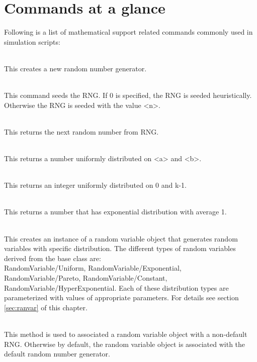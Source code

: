 \section{Commands at a glance}
\label{sec:mathcommand}

Following is a list of mathematical support related commands commonly used
in simulation scripts:
\begin{flushleft}
\\
This creates a new random number generator.


\\
This command seeds the RNG. If 0 is specified, the RNG is seeded
heuristically. Otherwise the RNG is seeded with the value <n>.


\\
This returns the next random number from RNG.


\\
This returns a number uniformly distributed on <a> and <b>.


\\
This returns an integer uniformly distributed on 0 and k-1.


\\
This returns a number that has exponential distribution with average 1.


\\
This creates an instance of a random variable object that generates random 
variables with specific distribution. The different types of random 
variables derived from the base class are:\\
RandomVariable/Uniform, RandomVariable/Exponential, RandomVariable/Pareto,
RandomVariable/Constant, RandomVariable/HyperExponential.
Each of these distribution types are parameterized with values of
appropriate parameters. For details see section \ref{sec:ranvar} of this
chapter.


\\
This method is used to associated a random variable object with a
non-default RNG. Otherwise by default, the random variable object is
associated with the default random number generator.


\end{flushleft}





